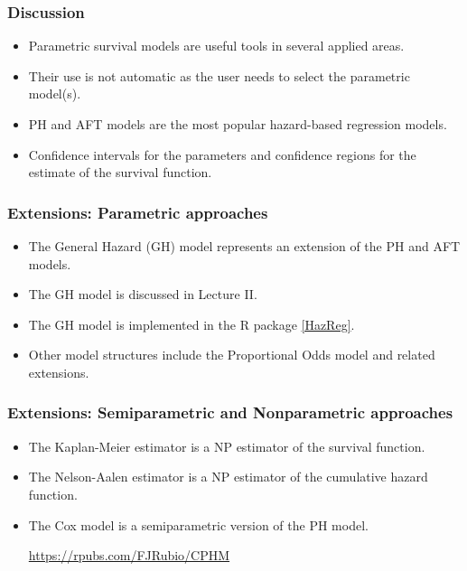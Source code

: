 \documentclass[10pt,handout,compress]{beamer}
\begin{document}
\begin{frame}
\frametitle{Discussion}
\begin{itemize}
\item Parametric survival models are useful tools in several applied areas.
\pause
\item Their use is not automatic as the user needs to select the parametric model(s).
\pause
\item PH and AFT models are the most popular hazard-based regression models.
\pause
\item Confidence intervals for the parameters and confidence regions for the estimate of the survival function.
\end{itemize}
\end{frame}

\begin{frame}
\frametitle{Extensions: Parametric approaches}
\begin{itemize}
\item The General Hazard (GH) model represents an extension of the PH and AFT models.
\item The GH model is discussed in Lecture II.
\item The GH model is implemented in the R package \href{https://github.com/FJRubio67/HazReg}{[HazReg]}.
\item Other model structures include the Proportional Odds model and related extensions.
\end{itemize}
\end{frame}

\begin{frame}
\frametitle{Extensions: Semiparametric and Nonparametric approaches}
\begin{itemize}
\item The Kaplan-Meier estimator is a NP estimator of the survival function.
\item The Nelson-Aalen estimator is a NP estimator of the cumulative hazard function.
\item The Cox model is a semiparametric version of the PH model.
\begin{center}
\url{https://rpubs.com/FJRubio/CPHM}
\end{center}

\end{itemize}
\end{frame}
\end{document}
